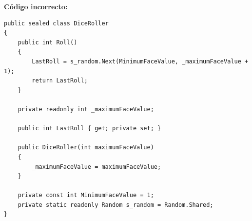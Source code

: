 \textbf{Código incorrecto:}
\begin{lstlisting}[style=csharpstyle]
public sealed class DiceRoller
{
    public int Roll()
    {
        LastRoll = s_random.Next(MinimumFaceValue, _maximumFaceValue + 1);
        return LastRoll;
    }

    private readonly int _maximumFaceValue;

    public int LastRoll { get; private set; }

    public DiceRoller(int maximumFaceValue)
    {
        _maximumFaceValue = maximumFaceValue;
    }

    private const int MinimumFaceValue = 1;
    private static readonly Random s_random = Random.Shared;
}
\end{lstlisting}
